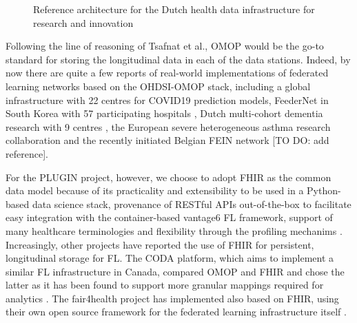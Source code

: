 \documentclass[
  authoryear]{elsarticle}
\begin{document}
\begin{figure}


\caption{\label{fig-healthri-architecture}Reference architecture for the
Dutch health data infrastructure for research and innovation
\citep{healthri2024agreements}}

\end{figure}%

Following the line of reasoning of Tsafnat et al., OMOP would be the
go-to standard for storing the longitudinal data in each of the data
stations. Indeed, by now there are quite a few reports of real-world
implementations of federated learning networks based on the OHDSI-OMOP
stack, including a global infrastructure with 22 centres for COVID19
prediction models\citep{khalid2021standardized}, FeederNet in South
Korea with 57 participating hospitals \citep{lee2022feedernet}, Dutch
multi-cohort dementia research with 9 centres \citep{mateus2024data},
the European severe heterogeneous asthma research collaboration
\citep{kroes2022blueprint} and the recently initiated Belgian FEIN
network {[}TO DO: add reference{]}.

For the PLUGIN project, however, we choose to adopt FHIR as the common
data model because of its practicality and extensibility to be used in a
Python-based data science stack, provenance of RESTful APIs
out-of-the-box to facilitate easy integration with the container-based
vantage6 FL framework, support of many healthcare terminologies and
flexibility through the profiling mechanims
\citep{choudhury2020personal, smits2022improved}. Increasingly, other
projects have reported the use of FHIR for persistent, longitudinal
storage for FL. The CODA platform, which aims to implement a similar FL
infrastructure in Canada, compared OMOP and FHIR and chose the latter as
it has been found to support more granular mappings required for
analytics \citep{mullie2023coda}. The fair4health project has
implemented also based on FHIR, using their own open source framework
for the federated learning infrastructure itself
\citep{sinaci2024privacypreserving}.
\end{document}

